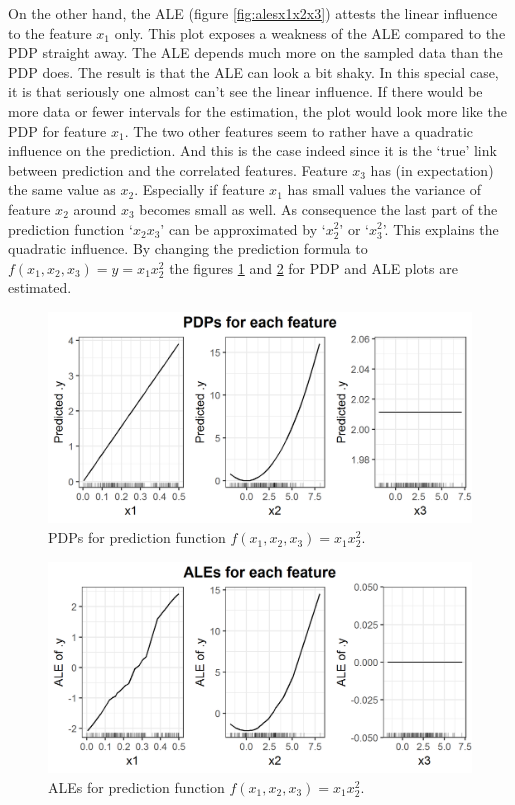 \documentclass[]{krantz}
\begin{document}
On the other hand, the ALE (figure \ref{fig:alesx1x2x3}) attests the
linear influence to the feature \(x_1\) only. This plot exposes a
weakness of the ALE compared to the PDP straight away. The ALE depends
much more on the sampled data than the PDP does. The result is that the
ALE can look a bit shaky. In this special case, it is that seriously one
almost can't see the linear influence. If there would be more data or
fewer intervals for the estimation, the plot would look more like the
PDP for feature \(x_1\). The two other features seem to rather have a
quadratic influence on the prediction. And this is the case indeed since
it is the `true' link between prediction and the correlated features.
Feature \(x_3\) has (in expectation) the same value as \(x_2\).
Especially if feature \(x_1\) has small values the variance of feature
\(x_2\) around \(x_3\) becomes small as well. As consequence the last
part of the prediction function `\(x_2 x_3\)' can be approximated by
`\(x_2^2\)' or `\(x_3^2\)'. This explains the quadratic influence. By
changing the prediction formula to \(f(x_1, x_2, x_3) = y = x_1 x_2^2\)
the figures \ref{fig:pdpsx1x22} and \ref{fig:alesx1x22} for PDP and ALE
plots are estimated.

\begin{figure}
\includegraphics[width=1\linewidth]{images/ale_1_PDPs_x1x22_150_0_0p5_2_2} \caption{PDPs for prediction function
\(f(x_1, x_2, x_3) = x_1 x_2^2\).}\label{fig:pdpsx1x22}
\end{figure}




\begin{figure}
\includegraphics[width=1\linewidth]{images/ale_1_ALEs_x1x22_150_0_0p5_2_2} \caption{ALEs for prediction function
\(f(x_1, x_2, x_3) = x_1 x_2^2\).}\label{fig:alesx1x22}
\end{figure}
\end{document}
